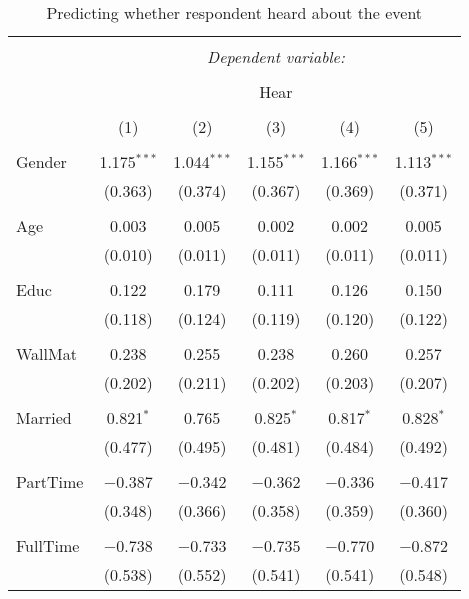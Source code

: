
\begin{table}[!htbp] \centering 
  \caption{Predicting whether respondent heard about the event} 
  \label{} 
\footnotesize 
\begin{tabular}{@{\extracolsep{5pt}}lccccc} 
\\[-1.8ex]\hline 
\hline \\[-1.8ex] 
 & \multicolumn{5}{c}{\textit{Dependent variable:}} \\ 
\cline{2-6} 
\\[-1.8ex] & \multicolumn{5}{c}{Hear} \\ 
\\[-1.8ex] & (1) & (2) & (3) & (4) & (5)\\ 
\hline \\[-1.8ex] 
 Gender & 1.175$^{***}$ & 1.044$^{***}$ & 1.155$^{***}$ & 1.166$^{***}$ & 1.113$^{***}$ \\ 
  & (0.363) & (0.374) & (0.367) & (0.369) & (0.371) \\ 
  & & & & & \\ 
 Age & 0.003 & 0.005 & 0.002 & 0.002 & 0.005 \\ 
  & (0.010) & (0.011) & (0.011) & (0.011) & (0.011) \\ 
  & & & & & \\ 
 Educ & 0.122 & 0.179 & 0.111 & 0.126 & 0.150 \\ 
  & (0.118) & (0.124) & (0.119) & (0.120) & (0.122) \\ 
  & & & & & \\ 
 WallMat & 0.238 & 0.255 & 0.238 & 0.260 & 0.257 \\ 
  & (0.202) & (0.211) & (0.202) & (0.203) & (0.207) \\ 
  & & & & & \\ 
 Married & 0.821$^{*}$ & 0.765 & 0.825$^{*}$ & 0.817$^{*}$ & 0.828$^{*}$ \\ 
  & (0.477) & (0.495) & (0.481) & (0.484) & (0.492) \\ 
  & & & & & \\ 
 PartTime & $-$0.387 & $-$0.342 & $-$0.362 & $-$0.336 & $-$0.417 \\ 
  & (0.348) & (0.366) & (0.358) & (0.359) & (0.360) \\ 
  & & & & & \\ 
 FullTime & $-$0.738 & $-$0.733 & $-$0.735 & $-$0.770 & $-$0.872 \\ 
  & (0.538) & (0.552) & (0.541) & (0.541) & (0.548) \\ 

\end{tabular}
\end{table}
